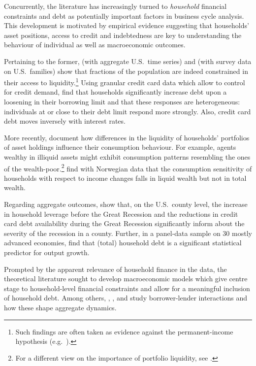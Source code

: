 \documentclass[a4paper,12pt]{article} %
\numberwithin{equation}{section} %
\numberwithin{figure}{section}
\numberwithin{table}{section}
\begin{document}
Concurrently, the literature has increasingly turned to \textit{household} financial constraints and debt as potentially important factors in business cycle analysis. This development is motivated by empirical evidence suggesting that households' asset positions, access to credit and indebtedness are key to understanding the behaviour of individual as well as macroeconomic outcomes. 

Pertaining to the former, \textcite{campbell1989} (with aggregate U.S.~time series) and \textcite{zeldes1989} (with survey data on U.S.~families) show that fractions of the population are indeed constrained in their access to liquidity.\footnote{Such findings are often taken as evidence against the permanent-income hypothesis (e.g.~\cite{kaplan2014}).} Using granular credit card data which allow to control for credit demand, \textcite{gross2002} find that households significantly increase debt upon a loosening in their borrowing limit and that these responses are heterogeneous: individuals at or close to their debt limit respond more strongly. Also, credit card debt moves inversely with interest rates. 

More recently, \textcite{kaplan2014} document how differences in the liquidity of households' portfolios of asset holdings influence their consumption behaviour. For example, agents wealthy in illiquid assets might exhibit consumption patterns resembling the ones of the wealth-poor.\footnote{For a different view on the importance of portfolio liquidity, see \textcite{aguiar2020}.} \textcite{fagereng2021mpc} find with Norwegian data that the consumption sensitivity of households with respect to income changes falls in liquid wealth but not in total wealth.

Regarding aggregate outcomes, \textcite{mian2010} show that, on the U.S.~county level, the increase in household leverage before the Great Recession and the reductions in credit card debt availability during the Great Recession significantly inform about the severity of the recession in a county. Further, in a panel-data sample on 30 mostly advanced economies, \textcite{mian2017} find that (total) household debt is a significant statistical predictor for output growth.

Prompted by the apparent relevance of household finance in the data, the theoretical literature sought to develop macroeconomic models which give centre stage to household-level financial constraints and allow for a meaningful inclusion of household debt. Among others, \textcite{egg2012}, \textcite{riosrull2015}, \textcite{justiniano2015} and \textcite{gl2017} study borrower-lender interactions and how these shape aggregate dynamics.
\end{document}
